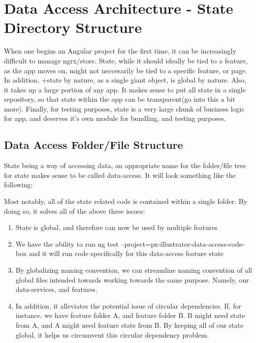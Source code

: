 \maketitle{}
\section{ Data Access Architecture - State Directory Structure }

When one begins an Angular project for the first time, it can be increasingly
difficult to manage ngrx/store. State, while it should ideally be tied to a
feature, as the app moves on, might not neccesarily be tied to a specific
feature, or page. In addition, +state by nature, as a single giant object,
is global by nature. Also, it takes up a large portion of any app. It makes
sense to put all state in a single repository, so that state within the app can
be transparent(go into this a bit more). Finally, for testing purposes, state is
a very large chunk of business logic for app, and deserves it's own module for
bundling, and testing purposes.

\subsection{Data Access Folder/File Structure }
State being a way of accessing data, an appropriate name for the folder/file
tree for state makes sense to be called data-access. It will look something
like the following:



Most notably, all of the state related code is contained within a single
folder. By doing so, it solves all of the above three issues:
\begin{enumerate}
  \item State is global, and therefore can now be used by multiple features
  \item We have the ability to run
  ng test --project=px-illustrator-data-access-code-box and it will run code
  specifically for this data-access feature state
  \item By globalizing naming convention, we can streamline naming convention
  of all global files intended towards working towards the same purpose. Namely,
  our data-services, and features.
  \item In addition, it alleviates the potential issue of circular dependencies.
  If, for instance, we have feature folder A, and feature folder B. B might need
  state from A, and A might need feature state from B. By keeping all of our
  state global, it helps us circumvent this circular dependency problem.
\end{enumerate}
